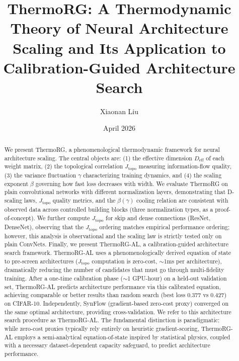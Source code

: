 \documentclass[11pt, a4paper]{article}
\theoremstyle{plain}
\begin{document}
\title{ThermoRG: A Thermodynamic Theory of Neural Architecture Scaling and Its Application to Calibration-Guided Architecture Search}

\author{Xiaonan Liu}

\date{April 2026}

\maketitle

\begin{abstract}
We present ThermoRG, a phenomenological thermodynamic framework for neural architecture scaling. The central objects are: (1) the effective dimension $D_{\mathrm{eff}}$ of each weight matrix, (2) the topological correlation $J_{\mathrm{topo}}$ measuring information-flow quality, (3) the variance fluctuation $\gamma$ characterizing training dynamics, and (4) the scaling exponent $\beta$ governing how fast loss decreases with width. We evaluate ThermoRG on plain convolutional networks with different normalization layers, demonstrating that D-scaling laws, $J_{\mathrm{topo}}$ quality metrics, and the $\beta(\gamma)$ cooling relation are consistent with observed data across controlled building blocks (three normalization types, as a proof-of-concept). We further compute $J_{\mathrm{topo}}$ for skip and dense connections (ResNet, DenseNet), observing that the $J_{\mathrm{topo}}$ ordering matches empirical performance ordering; however, this analysis is observational and the scaling law is strictly tested only on plain ConvNets. Finally, we present ThermoRG-AL, a calibration-guided architecture search framework. ThermoRG-AL uses a phenomenologically derived equation of state to pre-screen architectures ($J_{\mathrm{topo}}$ computation is zero-cost, $\sim$1ms per architecture), dramatically reducing the number of candidates that must go through multi-fidelity training. After a one-time calibration phase ($\sim$1 GPU-hour) on a held-out validation set, ThermoRG-AL predicts architecture performance via this calibrated equation, achieving comparable or better results than random search (best loss 0.377 vs 0.427) on CIFAR-10. Independently, SynFlow (gradient-based zero-cost proxy) converged on the same optimal architecture, providing cross-validation. We refer to this architecture search procedure as ThermoRG-AL. The fundamental distinction is paradigmatic: while zero-cost proxies typically rely entirely on heuristic gradient-scoring, ThermoRG-AL employs a semi-analytical equation-of-state inspired by statistical physics, coupled with a necessary dataset-dependent capacity safeguard, to predict architecture performance.
\end{abstract}
\end{document}
